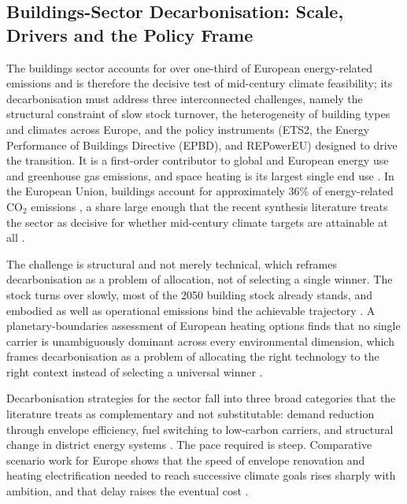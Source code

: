 \subsection{Buildings-Sector Decarbonisation: Scale, Drivers and the Policy Frame}
\label{sec:lit:buildings}

The buildings sector accounts for over one-third of European energy-related
emissions and is therefore the decisive test of mid-century climate feasibility;
its decarbonisation must address three interconnected challenges, namely the
structural constraint of slow stock turnover, the heterogeneity of building types
and climates across Europe, and the policy instruments (ETS2, the Energy
Performance of Buildings Directive (EPBD), and REPowerEU) designed to drive the
transition. It is a first-order contributor to global and European energy use and
greenhouse gas emissions, and space heating is its largest single end use
\citep{IPCC2018,Smith2018}. In the European
Union, buildings account for approximately 36\% of energy-related CO$_2$ emissions
\citep{EuropeanCommission2020GreenDeal}, a share large enough that the recent
synthesis literature treats the sector as decisive for whether mid-century climate
targets are attainable at all \citep{Azevedo2022,Calvin2023Ipcc}.

The challenge is structural and not merely technical, which reframes
decarbonisation as a problem of allocation, not of selecting a single
winner. The stock turns over slowly, most of the 2050 building stock already
stands, and embodied as well as operational emissions bind the achievable
trajectory \citep{Rck2019Embodied,Pomponi2020Buildings}. A
planetary-boundaries assessment of European heating options finds that no single
carrier is unambiguously dominant across every environmental dimension, which
frames decarbonisation as a problem of allocating the right technology to the
right context instead of selecting a universal winner \citep{Weidner2023Planetary}.

Decarbonisation strategies for the sector fall into three broad categories that
the literature treats as complementary and not substitutable: demand
reduction through envelope efficiency, fuel switching to low-carbon carriers, and
structural change in district energy systems \citep{Azevedo2022,Mathiesen2019Towards}. The pace required is steep. Comparative scenario
work for Europe shows that the speed of envelope renovation and heating
electrification needed to reach successive climate goals rises sharply with
ambition, and that delay raises the eventual cost \citep{Victoria2022Speed,
Mdua2023Towards}.

